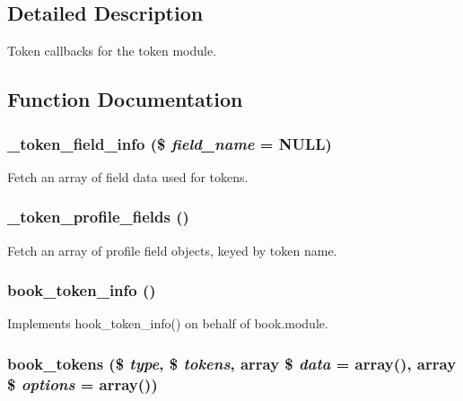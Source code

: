 \subsection{Detailed Description}
Token callbacks for the token module. 

\subsection{Function Documentation}
\hypertarget{token_8tokens_8inc_a863ababdc18d92450465ee4a3ebc9f62}{
\subsubsection[{\_\-token\_\-field\_\-info}]{\setlength{\rightskip}{0pt plus 5cm}\_\-token\_\-field\_\-info (\$ {\em field\_\-name} = {\ttfamily NULL})}}
\label{token_8tokens_8inc_a863ababdc18d92450465ee4a3ebc9f62}
Fetch an array of field data used for tokens. \hypertarget{token_8tokens_8inc_ad36240eb20997d7ac4a269acdbab5bc0}{
\subsubsection[{\_\-token\_\-profile\_\-fields}]{\setlength{\rightskip}{0pt plus 5cm}\_\-token\_\-profile\_\-fields ()}}
\label{token_8tokens_8inc_ad36240eb20997d7ac4a269acdbab5bc0}
Fetch an array of profile field objects, keyed by token name. \hypertarget{token_8tokens_8inc_a6499d39402db3d80a41c5791d4deff90}{
\subsubsection[{book\_\-token\_\-info}]{\setlength{\rightskip}{0pt plus 5cm}book\_\-token\_\-info ()}}
\label{token_8tokens_8inc_a6499d39402db3d80a41c5791d4deff90}
Implements hook\_\-token\_\-info() on behalf of book.module. \hypertarget{token_8tokens_8inc_a107b610501b0cf966d8b2df90becf740}{
\subsubsection[{book\_\-tokens}]{\setlength{\rightskip}{0pt plus 5cm}book\_\-tokens (\$ {\em type}, \/  \$ {\em tokens}, \/  array \$ {\em data} = {\ttfamily array()}, \/  array \$ {\em options} = {\ttfamily array()})}}
